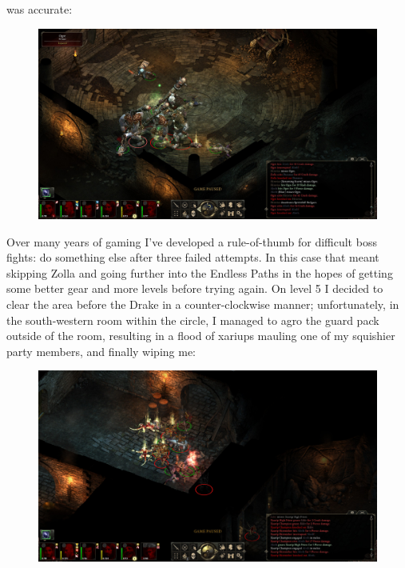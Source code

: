 \documentclass{article}
\begin{document}
was accurate:

\begin{figure}
\includegraphics[scale=0.33]{files/blog/2018_06_16_pillars_of_eternity_path_of_the_damned_act_i/2018_06_16_zolla_r1_wipe3.jpg}
\end{figure}

Over many years of gaming I've developed a rule-of-thumb for difficult boss fights: do something else after three failed attempts.  In this case that meant skipping Zolla and going further into the Endless Paths in the hopes of getting some better gear and more levels before trying again.  On level 5 I decided to clear the area before the Drake in a counter-clockwise manner; unfortunately, in the south-western room within the circle, I managed to agro the guard pack outside of the room, resulting in a flood of xariups mauling one of my squishier party members, and finally wiping me:

\begin{figure}
\includegraphics[scale=0.33]{files/blog/2018_06_16_pillars_of_eternity_path_of_the_damned_act_i/2018_06_16_l5_xariups.jpg}
\end{figure}
\end{document}
